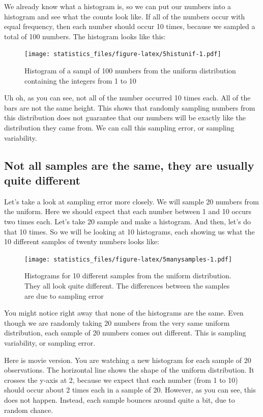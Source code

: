 \documentclass[]{book}
\begin{document}
We already know what a histogram is, so we can put our numbers into a histogram and see what the counts look like. If all of the numbers occur with equal frequency, then each number should occur 10 times, because we sampled a total of 100 numbers. The histogram looks like this:

\begin{figure}
\centering
\texttt{[image: statistics\_files/figure-latex/5histunif-1.pdf]}
\caption{\label{fig:5histunif}Histogram of a sampl of 100 numbers from the uniform distribution containing the integers from 1 to 10}
\end{figure}

Uh oh, as you can see, not all of the number occurred 10 times each. All of the bars are not the same height. This shows that randomly sampling numbers from this distribution does not guarantee that our numbers will be exactly like the distribution they came from. We can call this sampling error, or sampling variability.

\hypertarget{not-all-samples-are-the-same-they-are-usually-quite-different}{%
\subsection{Not all samples are the same, they are usually quite different}\label{not-all-samples-are-the-same-they-are-usually-quite-different}}

Let's take a look at sampling error more closely. We will sample 20 numbers from the uniform. Here we should expect that each number between 1 and 10 occurs two times each. Let's take 20 sample and make a histogram. And then, let's do that 10 times. So we will be looking at 10 histograms, each showing us what the 10 different samples of twenty numbers looks like:

\begin{figure}
\centering
\texttt{[image: statistics\_files/figure-latex/5manysamples-1.pdf]}
\caption{\label{fig:5manysamples}Histograms for 10 different samples from the uniform distribution. They all look quite different. The differences between the samples are due to sampling error}
\end{figure}

You might notice right away that none of the histograms are the same. Even though we are randomly taking 20 numbers from the very same uniform distribution, each sample of 20 numbers comes out different. This is sampling variability, or sampling error.

Here is movie version. You are watching a new histogram for each sample of 20 observations. The horizontal line shows the shape of the uniform distribution. It crosses the y-axis at 2, because we expect that each number (from 1 to 10) should occur about 2 times each in a sample of 20. However, as you can see, this does not happen. Instead, each sample bounces around quite a bit, due to random chance.
\end{document}
